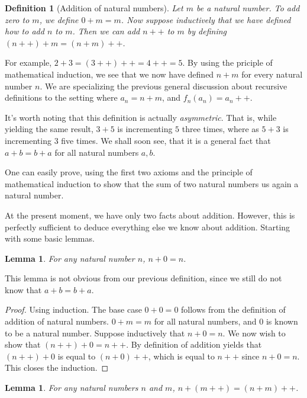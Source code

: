 \documentclass[a4paper, twocolumn]{report}
\newcounter{dummy} \numberwithin{dummy}{section}
\newtheorem{defn}[dummy]{Definition}
\newtheorem{lma}[dummy]{Lemma}
\begin{document}
\begin{defn}[Addition of natural numbers]
  Let $m$ be a natural number. To add zero to $m$, we define $0 + m = m$. Now
  suppose inductively that we have defined how to add $n$ to $m$. Then we can
  add $n++$ to $m$ by defining $(n++) + m = (n + m)++$.        
\end{defn}

For example, $2 + 3 = (3++)++ = 4++ = 5$. By using the priciple of mathematical
induction, we see that we now have defined $n + m$ for every natural number
$n$. We are specializing the previous general discussion about recursive
definitions to the setting where $a_{n} = n + m$, and $f_{n}\left( a_n \right)
= a_{n}++$.

It's worth noting that this definition is actually \textit{asymmetric}. That
is, while yielding the same result, $3 + 5$ is incrementing $5$ three times,
where as $5 + 3$ is incrementing $3$ five times. We shall soon see, that it is
a general fact that $a + b = b + a$ for all natural numbers $a, b$. 

One can easily prove, using the first two axioms and the principle of
mathematical induction to show that the sum of two natural numbers us again a
natural number.

At the present moment, we have only two facts about addition. However, this is
perfectly sufficient to deduce everything else we know about addition. Starting
with some basic lemmas.

\begin{lma}
  For any natural number $n$, $n + 0 = n$. 
\end{lma}

This lemma is not obvious from our previous definition, since we still do not
know that $a + b = b + a$. 

\begin{proof}
  Using induction. The base case $0 + 0 = 0$ follows from the definition of
  addition of natural numbers.  $0 + m = m$ for all natural numbers, and $0$ is
  known to be a natural number.  Suppose inductively that $n + 0 = n$. We now
  wish to show that $(n++) + 0 = n++$. By definition of addition yields that
  $(n++) + 0$ is equal to $(n + 0)++$, which is equal to $n++$ since $n + 0 =
  n$. This closes the induction.
\end{proof}

\begin{lma}
  For any natural numbers $n$ and $m$, $n + (m++) = (n + m)++$.
\end{lma}
\end{document}
